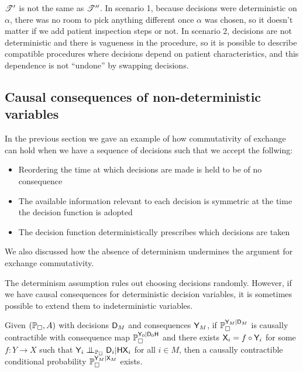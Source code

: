 $\mathscr{T}'$ is not the same as $\mathscr{T}''$. In scenario 1, because decisions were deterministic on $\alpha$, there was no room to pick anything different once $\alpha$ was chosen, so it doesn't matter if we add patient inspection steps or not. In scenario 2, decisions are not deterministic and there is vagueness in the procedure, so it is possible to describe compatible procedures where decisions depend on patient characteristics, and this dependence is not ``undone'' by swapping decisions.


\subsection{Causal consequences of non-deterministic variables}

In the previous section we gave an example of how commutativity of exchange can hold when we have a sequence of decisions such that we accept the follwing:

\begin{itemize}
    \item Reordering the time at which decisions are made is held to be of no consequence
    \item The available information relevant to each decision is symmetric at the time the decision function is adopted
    \item The decision function deterministically prescribes which decisions are taken
\end{itemize}

We also discussed how the absence of determinism undermines the argument for exchange commutativity.

The determinism assumption rules out choosing decisions randomly. However, if we have causal consequences for deterministic decision variables, it is sometimes possible to extend them to indeterministic variables. 


\begin{lemma}\label{lem:proxy_control}
Given $(\mathbb{P}_\square,A)$ with decisions $\mathsf{D}_M$ and consequences $\mathsf{Y}_M$, if $\mathbb{P}_\square^{\mathsf{Y}_M|\mathsf{D}_M}$ is causally contractible with consequence map $\mathbb{P}_\square^{\mathsf{Y}_0|\mathsf{D}_0\mathsf{H}}$ and there exists $\mathsf{X}_i=f\circ \mathsf{Y}_i$ for some $f:Y\to X$ such that $\RV{Y}_i\CI_{\prob{P}_\square} \RV{D}_i|\RV{HX}_i$ for all $i\in M$, then a causally contractible conditional probability $\mathbb{P}_\square^{\mathsf{Y}_M|\mathsf{X}_M}$ exists.
\end{lemma}

